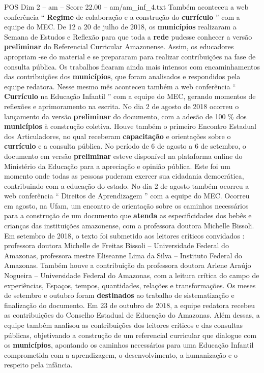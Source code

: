 \begin{textsample}{POS Dim 2 – am – Score 22.00 – am/am\_inf\_4.txt}
Também aconteceu a web conferência “ \textbf{Regime} de colaboração e a construção do \textbf{currículo} ” com a equipe do MEC.
De 12 a 20 de julho de 2018, os \textbf{municípios} realizaram a Semana de Estudos e Reflexão para que toda a \textbf{rede} pudesse conhecer a versão \textbf{preliminar} do Referencial Curricular Amazonense.
Assim, os educadores apropriam -se do material e se prepararam para realizar contribuições na fase de consulta pública.
Os trabalhos ficaram ainda mais intensos com encaminhamentos das contribuições dos \textbf{municípios}, que foram analisados e respondidos pela equipe redatora.
Nesse mesmo mês aconteceu também a web conferência “ \textbf{Currículo} na Educação Infantil ” com a equipe do MEC, gerando momentos de reflexões e aprimoramento na escrita.
No dia 2 de agosto de 2018 ocorreu o lançamento da versão \textbf{preliminar} do documento, com a adesão de 100 \% dos \textbf{municípios} à construção coletiva.
Houve também o primeiro Encontro Estadual dos Articuladores, no qual receberam \textbf{capacitação} e orientações sobre o \textbf{currículo} e a consulta pública.
No período de 6 de agosto a 6 de setembro, o documento em versão \textbf{preliminar} esteve disponível na plataforma online do Ministério da Educação para a apreciação e opinião pública.
Este foi um momento onde todas as pessoas puderam exercer sua cidadania democrática, contribuindo com a educação do estado.
No dia 2 de agosto também ocorreu a web conferência “ Direitos de Aprendizagem ” com a equipe do MEC.
Ocorreu em agosto, na Ufam, um encontro de orientação sobre os caminhos necessários para a construção de um documento que \textbf{atenda} as especificidades dos bebês e crianças das instituições amazonense, com a professora doutora Michelle Bissoli.
Em setembro de 2018, o texto foi submetido aos leitores críticos convidados : professora doutora Michelle de Freitas Bissoli – Universidade Federal do Amazonas, professora mestre Eliseanne Lima da Silva – Instituto Federal do Amazonas.
Também houve a contribuição da professora doutora Arlene Araújo Nogueira – Universidade Federal do Amazonas, com a leitura crítica do campo de experiências, Espaços, tempos, quantidades, relações e transformações.
Os meses de setembro e outubro foram \textbf{destinados} ao trabalho de sistematização e finalização do documento.
Em 23 de outubro de 2018, a equipe redatora recebeu as contribuições do Conselho Estadual de Educação do Amazonas.
Além dessas, a equipe também analisou as contribuições dos leitores críticos e das consultas públicas, objetivando a construção de um referencial curricular que dialogue com os \textbf{municípios}, apontando os caminhos necessários para uma Educação Infantil comprometida com a aprendizagem, o desenvolvimento, a humanização e o respeito pela infância.

\end{textsample}
